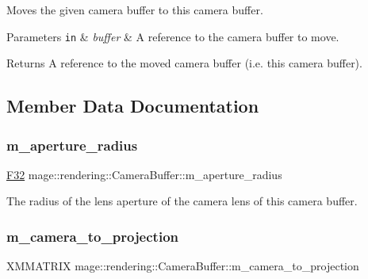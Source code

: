Moves the given camera buffer to this camera buffer.


\begin{DoxyParams}[1]{Parameters}
\mbox{\tt in}  & {\em buffer} & A reference to the camera buffer to move. \\
\hline
\end{DoxyParams}
\begin{DoxyReturn}{Returns}
A reference to the moved camera buffer (i.\+e. this camera buffer). 
\end{DoxyReturn}


\subsection{Member Data Documentation}
\mbox{\label{structmage_1_1rendering_1_1_camera_buffer_a65ebdf1e7e9dad21cf4a6ef471a44528}} 
\subsubsection{\texorpdfstring{m\+\_\+aperture\+\_\+radius}{m\_aperture\_radius}}
{\footnotesize\ttfamily \mbox{\hyperlink{namespacemage_aa97e833b45f06d60a0a9c4fc22ae02c0}{F32}} mage\+::rendering\+::\+Camera\+Buffer\+::m\+\_\+aperture\+\_\+radius}

The radius of the lens aperture of the camera lens of this camera buffer. \mbox{\label{structmage_1_1rendering_1_1_camera_buffer_a75669aa0916514b1d414e5a2f7c72c75}} 
\subsubsection{\texorpdfstring{m\+\_\+camera\+\_\+to\+\_\+projection}{m\_camera\_to\_projection}}
{\footnotesize\ttfamily X\+M\+M\+A\+T\+R\+IX mage\+::rendering\+::\+Camera\+Buffer\+::m\+\_\+camera\+\_\+to\+\_\+projection}

